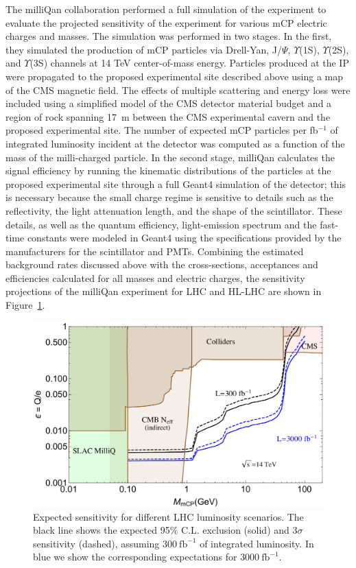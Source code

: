  The milliQan collaboration performed a full simulation of the experiment to evaluate the projected sensitivity of the experiment for various mCP electric charges and masses. The simulation was performed in two stages. In the first, they simulated the production of mCP particles via Drell-Yan, J/$\Psi$, $\Upsilon$(1S), $\Upsilon$(2S), and $\Upsilon$(3S) channels at 14 TeV center-of-mass energy. Particles produced at the IP were propagated  to the proposed experimental site described above using a map of the CMS magnetic field. The effects of multiple scattering and energy loss were included using a simplified model of the CMS detector material budget and a region of rock spanning 17~m between the CMS experimental cavern and the proposed experimental site. The number of expected mCP particles per fb$^{-1}$ of integrated luminosity incident at the detector was computed as a function of the mass of the milli-charged particle. In the second stage, milliQan calculates the signal efficiency by running the kinematic distributions of the particles at the proposed experimental site through a full {\sc Geant4} simulation of the detector; this is necessary because the small charge regime is sensitive to details such as the reflectivity, the light attenuation length, and the shape of the scintillator. These details, as well as the quantum efficiency, light-emission spectrum and the fast-time constants were modeled in {\sc Geant4} using the specifications provided by the manufacturers for the scintillator and PMTs. Combining the estimated background rates discussed above with the cross-sections, acceptances and efficiencies calculated for all masses and electric charges, the sensitivity projections of the milliQan experiment for LHC and HL-LHC are shown in Figure~\ref{fig:abc}.


\begin{figure}[h]
   \centering
   \includegraphics[width=0.6\linewidth]{figures/milliqan/exclusionplots_5b5.pdf}
   \caption{Expected sensitivity for different LHC luminosity scenarios. The black line shows the expected 95\% C.L. exclusion (solid) and $3\sigma$ sensitivity (dashed),
assuming $300~\text{fb}^{-1}$ of integrated luminosity. In blue we show the corresponding expectations for $3000~\text{fb}^{-1}$.
\label{fig:abc}}
\end{figure}


